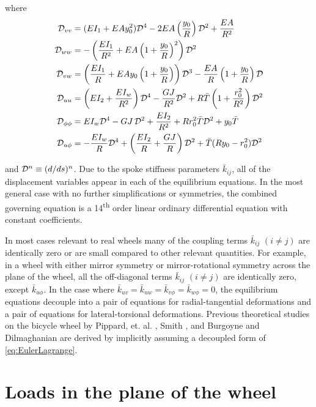\documentclass[\rootdir/thesis.tex]{subfiles}
\begin{document}
where
\begin{align*}
\mathcal{D}_{vv} &= (EI_1 + EAy_0^2)\mathcal{D}^4 - 2EA\left(\frac{y_0}{R}\right)\mathcal{D}^2 + \frac{EA}{R^2}\\
\mathcal{D}_{ww} &= -\left(\frac{EI_1}{R^2} + EA\left(1+\frac{y_0}{R}\right)^2\right)\mathcal{D}^2\\
\mathcal{D}_{vw} &= \left(\frac{EI_1}{R} + EAy_0\left(1+\frac{y_0}{R}\right)\right)\mathcal{D}^3 - \frac{EA}{R}\left(1+\frac{y_0}{R}\right)\mathcal{D}\\
\mathcal{D}_{uu} &= \left(EI_2 + \frac{EI_w}{R^2}\right)\mathcal{D}^4 - \frac{GJ}{R^2}\mathcal{D}^2
    + R\bar{T}\left(1 + \frac{r_0^2}{R^2}\right)\mathcal{D}^2\\
\mathcal{D}_{\phi\phi} &= EI_w\mathcal{D}^4 - GJ\,\mathcal{D}^2 + \frac{EI_2}{R^2}
    + Rr_0^2\bar{T}\mathcal{D}^2 + y_0\bar{T}\\
\mathcal{D}_{u\phi} &= -\frac{EI_w}{R}\mathcal{D}^4 + \left(\frac{EI_2}{R} + \frac{GJ}{R}\right)\mathcal{D}^2
    + \bar{T}(Ry_0 - r_0^2)\mathcal{D}^2
\end{align*}

and $\mathcal{D}^n \equiv (d/ds)^n$. Due to the spoke stiffness parameters $\bar{k}_{ij}$, all of the displacement variables appear in each of the equilibrium equations. In the most general case with no further simplifications or symmetries, the combined governing equation is a 14\textsuperscript{th} order linear ordinary differential equation with constant coefficients.

In most cases relevant to real wheels many of the coupling terms $\bar{k}_{ij}$ $(i \neq j)$ are identically zero or are small compared to other relevant quantities. For example, in a wheel with either mirror symmetry or mirror-rotational symmetry across the plane of the wheel, all the off-diagonal terms $\bar{k}_{ij}$ $(i \neq j)$ are identically zero, except $\bar{k}_{u\phi}$. In the case where $\bar{k}_{uv}=\bar{k}_{uw}=\bar{k}_{v\phi}=\bar{k}_{w\phi}=0$, the equilibrium equations decouple into a pair of equations for radial-tangential deformations and a pair of equations for lateral-torsional deformations. Previous theoretical studies on the bicycle wheel by Pippard, et. al. \cite{Pippard1931,Pippard1932a,Pippard1932b}, Smith \cite{Smith1901}, and Burgoyne and Dilmaghanian \cite{Burgoyne1993} are derived by implicitly assuming a decoupled form of \eqref{eq:EulerLagrange}.

\section{Loads in the plane of the wheel}
\label{sec:RadTan}

\end{document}
